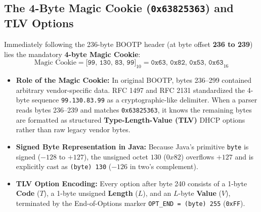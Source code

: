 \documentclass[11pt,a4paper]{article}
\begin{document}
\subsection{The 4-Byte Magic Cookie (\texttt{0x63825363}) and TLV Options}
Immediately following the 236-byte BOOTP header (at byte offset \textbf{236 to 239}) lies the mandatory \textbf{4-byte Magic Cookie}:
\[
\text{Magic Cookie} = \texttt{[99, 130, 83, 99]}_{10} = \texttt{0x63, 0x82, 0x53, 0x63}_{16}
\]
\begin{itemize}[leftmargin=2em]
    \item \textbf{Role of the Magic Cookie:} In original BOOTP, bytes 236--299 contained arbitrary vendor-specific data. RFC 1497 and RFC 2131 standardized the 4-byte sequence \texttt{99.130.83.99} as a cryptographic-like delimiter. When a parser reads bytes 236--239 and matches \texttt{0x63825363}, it knows the remaining bytes are formatted as structured \textbf{Type-Length-Value (TLV)} DHCP options rather than raw legacy vendor bytes.
    \item \textbf{Signed Byte Representation in Java:} Because Java's primitive \texttt{byte} is signed ($-128$ to $+127$), the unsigned octet $130$ ($0x82$) overflows $+127$ and is explicitly cast as \texttt{(byte) 130} ($-126$ in two's complement).
    \item \textbf{TLV Option Encoding:} Every option after byte 240 consists of a 1-byte \textbf{Code} ($T$), a 1-byte unsigned \textbf{Length} ($L$), and an $L$-byte \textbf{Value} ($V$), terminated by the End-of-Options marker \texttt{OPT\_END = (byte) 255} (\texttt{0xFF}).
\end{itemize}
\end{document}
